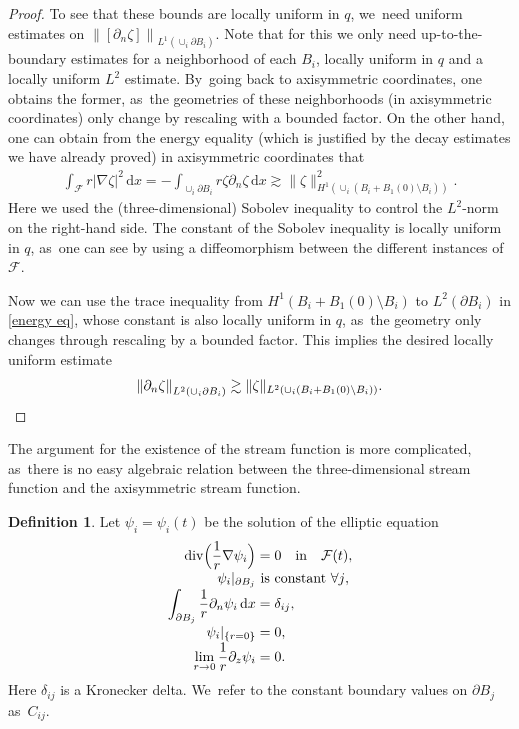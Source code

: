 \documentclass[JEP,XML,SOM,Unicode,published]{cedram}
\let\backslash\setminus
\theoremstyle{definition}
\newtheorem{definition}[theorem]{Definition}
\renewcommand{\div}{\operatorname{div}}
\newcommand\norm[1]{\left\lVert #1\right\rVert}
\newcommand\anorm[1]{\lVert #1\rVert}
\newcommand\eq{=}
\newcommand\dd{\,\mathrm{d}}
\newcommand\dx{\dd x}
\let\de\partial
\begin{document}
\begin{proof}
To see that these bounds are locally uniform in $q$, we~need uniform estimates on $\norm{[\de_n\zeta]}_{L^1(\cup_i\de B_i)}$. Note that for this we only need up-to-the-boundary estimates for a neighborhood of each $B_i$, locally uniform in $q$ and a locally uniform $L^2$ estimate. By~going back to axisymmetric coordinates, one obtains the former, as~the geometries of these neighborhoods (in axisymmetric coordinates) only change by rescaling with a bounded factor.
On the other hand, one can obtain from the energy equality (which is justified by the decay estimates we have already proved) in axisymmetric coordinates that
\begin{align}\label{energy eq}
\int_{\mathcal{F}} r|\nabla\zeta|^2\dx\eq -\int_{\cup_i \de B_i}r\zeta\de_n \zeta\dx\gtrsim \anorm{\zeta}_{H^1(\cup_i (B_i+B_1(0)\backslash B_i))}^2.
\end{align}
Here we used the (three-dimensional) Sobolev inequality to control the $L^2$-norm on the right-hand side. The constant of the Sobolev inequality is locally uniform in $q$, as~one can \eg see by using a diffeomorphism between the different instances of $\mathcal{F}$.

Now we can use the trace inequality from $H^1(B_i+B_1(0)\backslash B_i)$ to $L^2(\de B_i)$ in \eqref{energy eq}, whose constant is also locally uniform in $q$, as~the geometry only changes through rescaling by a bounded factor. This implies the desired locally uniform estimate
\[
\norm{\de_n\zeta}_{L^2(\cup_i\de B_i)}\gtrsim\anorm{\zeta}_{L^2(\cup_i (B_i+B_1(0)\backslash B_i))}.\qedhere
\]
\end{proof}

\begingroup

The argument for the existence of the stream function is more complicated, as~there is no easy algebraic relation between the three-dimensional stream function and the axisymmetric stream function.

\begin{definition}\label{def psi}
Let $\psi_{i}=\psi_i(t)$ be the solution of the elliptic equation
\begin{equation}
\label{Flow}
\begin{aligned}
\div\Bigl(\frac{1}{r}\nabla\psi_{i}\Bigr)&\eq0\quad \mathrm{ in }\quad\text{}\mathcal{F}(t),\\[-3pt]
\psi_{i}|_{\de B_j}&\text{ is constant $\forall j$},\\[-3pt]
\int_{\de B_j}\frac{1}{r}\de_{n}\psi_{i}\dx&\eq\delta_{ij},\\[-3pt]
\psi_i|_{\{r=0\}}&\eq0,\\[-3pt]
\lim_{r\to 0}\frac{1}{r}\de_z\psi_i&\eq 0.
\end{aligned}
\end{equation}
Here $\delta_{ij}$ is a Kronecker delta. We~refer to the constant boundary values on $\de B_j$ as~$C_{ij}$.
\end{definition}
\end{document}
